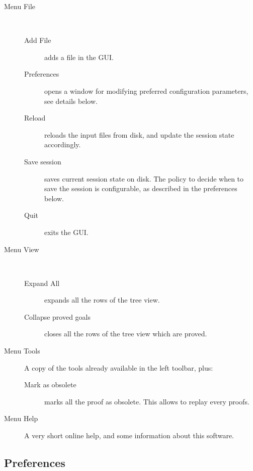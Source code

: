 \begin{description}
\item[Menu \textsf{File}]~
\begin{description}
\item[Add File] adds a file in the GUI.
\item[Preferences] opens a window for modifying preferred
  configuration parameters, see details below.
\item[Reload] reloads the input files from disk, and update the session state accordingly.
\item[Save session] saves current session state on disk. The policy to decide when to save the session is configurable, as described in the preferences below.
\item[Quit] exits the GUI.
\end{description}

\item[Menu \textsf{View}]~
\begin{description}
\item[Expand All] expands all the rows of the tree view.
\item[Collapse proved goals] closes all the rows of the tree view
  which are proved.
\end{description}

\item[Menu \textsf{Tools}]
A copy of the tools already available in the left toolbar, plus:
\begin{description}
\item[Mark as obsolete] marks all the proof as obsolete. This allows to
  replay every proofs.
\end{description}

\item[Menu \textsf{Help}]
A very short online help, and some information about this software.
\end{description}

\subsection{Preferences}

